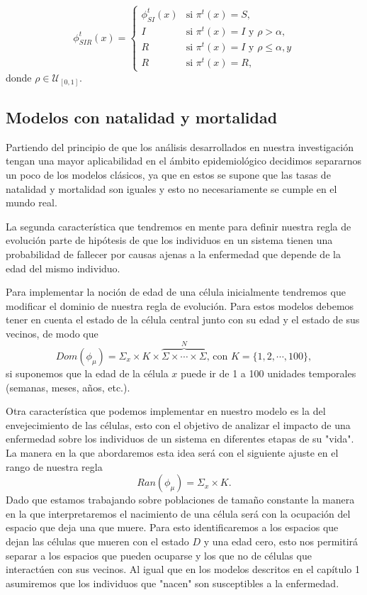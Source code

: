\begin{equation}
    \phi_{SIR}^t(x)=\left\{\begin{array}{ll}
        \phi_{SI}^t(x) & \text{si }\pi^t(x) = S,\\
        I & \text{si }\pi^t(x)=I\text{ y }\rho>\alpha,\\
        R & \text{si }\pi^t(x)=I\text{ y }\rho\leq\alpha, y \\
        R & \text{si }\pi^t(x)=R,
    \end{array}\right.
\end{equation}
donde $\rho\in\mathcal{U}_{[0,1]}$.
\subsection{Modelos con natalidad y mortalidad}
Partiendo del principio de que los análisis desarrollados en nuestra investigación tengan una mayor aplicabilidad en el ámbito epidemiológico decidimos separarnos un poco de los modelos clásicos, ya que en estos se supone que las tasas de natalidad y mortalidad son iguales y esto no necesariamente se cumple en el mundo real.

La segunda característica que tendremos en mente para definir nuestra regla de evolución parte de hipótesis de que los individuos en un sistema tienen una probabilidad de fallecer por causas ajenas a la enfermedad que depende de la edad del mismo individuo.

Para implementar la noción de edad de una célula inicialmente tendremos que modificar el dominio de nuestra regla de evolución. Para estos modelos debemos tener en cuenta el estado de la célula central junto con su edad y el estado de sus vecinos, de modo que 
$$Dom(\phi_\mu)=\Sigma_x\times K\times\overbrace{\Sigma\times\cdots\times\Sigma}^N\text{, con }K=\{1,2,\cdots,100\},$$
si suponemos que la edad de la célula $x$ puede ir de 1 a 100 unidades temporales (semanas, meses, años, etc.).

Otra característica que podemos implementar en nuestro modelo es la del envejecimiento de las células, esto con el objetivo de analizar el impacto de una enfermedad sobre los individuos de un sistema en diferentes etapas de su "vida". La manera en la que abordaremos esta idea será con el siguiente ajuste en el rango de nuestra regla
$$Ran(\phi_\mu)=\Sigma_x\times K.$$
Dado que estamos trabajando sobre poblaciones de tamaño constante la manera en la que interpretaremos el nacimiento de una célula será con la ocupación del espacio que deja una que muere. Para esto identificaremos a los espacios que dejan las células que mueren con el estado $D$ y una edad cero, esto nos permitirá separar a los espacios que pueden ocuparse y los que no de células que interactúen con sus vecinos. Al igual que en los modelos descritos en el capítulo 1 asumiremos que los individuos que "nacen" son susceptibles a la enfermedad.

